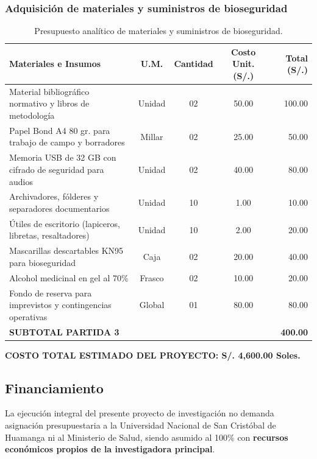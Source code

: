 \subsubsection{Adquisición de materiales y suministros de bioseguridad}
\label{sec:5.2.3_materiales}
\begin{table}[H]
\centering
\small
\begin{tabularx}{\textwidth}{Xcccr}
\toprule
\textbf{Materiales e Insumos} & \textbf{U.M.} & \textbf{Cantidad} & \textbf{Costo Unit. (S/.)} & \textbf{Total (S/.)} \\
\midrule
Material bibliográfico normativo y libros de metodología & Unidad & 02 & 50.00 & 100.00 \\
Papel Bond A4 80 gr. para trabajo de campo y borradores & Millar & 02 & 25.00 & 50.00 \\
Memoria USB de 32 GB con cifrado de seguridad para audios & Unidad & 02 & 40.00 & 80.00 \\
Archivadores, fólderes y separadores documentarios & Unidad & 10 & 1.00 & 10.00 \\
Útiles de escritorio (lapiceros, libretas, resaltadores) & Unidad & 10 & 2.00 & 20.00 \\
Mascarillas descartables KN95 para bioseguridad & Caja & 02 & 20.00 & 40.00 \\
Alcohol medicinal en gel al 70\% & Frasco & 02 & 10.00 & 20.00 \\
Fondo de reserva para imprevistos y contingencias operativas & Global & 01 & 80.00 & 80.00 \\
\midrule
\textbf{SUBTOTAL PARTIDA 3} & & & & \textbf{400.00} \\
\bottomrule
\end{tabularx}
\caption{Presupuesto analítico de materiales y suministros de bioseguridad.}
\label{tab:presupuesto_materiales}
\end{table}

\noindent\textbf{COSTO TOTAL ESTIMADO DEL PROYECTO: S/. 4,600.00 Soles.}

\subsection{Financiamiento}
\label{sec:5.3_financiamiento}
La ejecución integral del presente proyecto de investigación no demanda asignación presupuestaria a la Universidad Nacional de San Cristóbal de Huamanga ni al Ministerio de Salud, siendo asumido al 100\% con \textbf{recursos económicos propios de la investigadora principal}.

